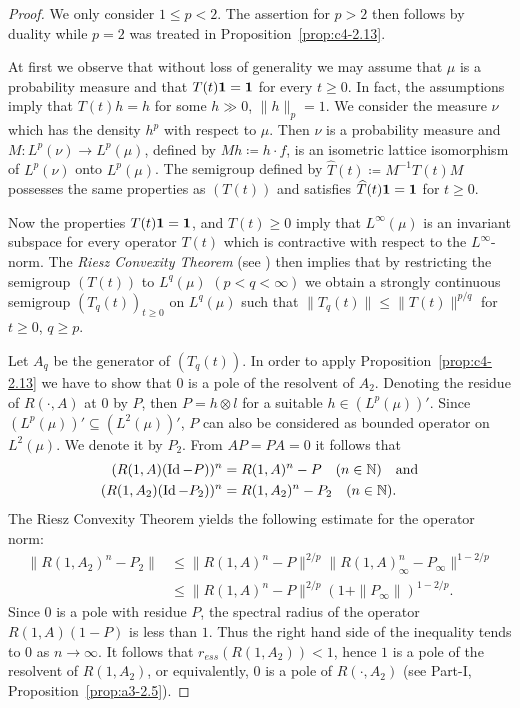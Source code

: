 \begin{proof}
We only consider $1 \leq p < 2$.
The assertion for $p > 2$ then follows by duality while $p = 2$ was treated in Proposition~\ref{prop:c4-2.13}.

At first we observe that without loss of generality we may assume that $\mu$ is a probability measure and that $T(t)\mathbf{1} = \mathbf{1}$ for every $t \geq 0$.
In fact, the assumptions imply that $T(t)h = h$ for some $h \gg 0$, $\|h\|_{p} = 1$.
We consider the measure $\nu$ which has the density $h^{p}$ with respect to $\mu$.
Then $\nu$ is a probability measure and 
$M \colon L^{p}(\nu) \to L^{p}(\mu)$, defined by $Mh \coloneqq h\cdot f$, is an isometric lattice isomorphism of\/ $L^{p}(\nu)$ onto $L^{p}(\mu)$.
The semigroup defined by $\widehat{T}(t) \coloneqq M^{-1}T(t)M$ possesses the same properties as $(T(t))$ and satisfies $\widehat{T}(t)\mathbf{1} = \mathbf{1}$ for $t \geq 0$.

Now the properties $T(t)\mathbf{1} = \mathbf{1}$, and $T(t) \geq 0$ imply that $L^{\infty}(\mu)$ is an invariant subspace for every operator $T(t)$ which is contractive with respect to the $L^{\infty}$-norm.
The \emph{Riesz Convexity Theorem} (see \textcite[VI.10.11]{dunfordschwartz:1958}) then implies that by restricting the semigroup $(T(t))$ to $L^{q}(\mu)$ $(p < q < \infty)$ we obtain a strongly continuous semigroup $(T_{q}(t))_{t \geq 0}$ on $L^{q}(\mu)$ such that $\|T_{q}(t)\| \leq \|T(t)\|^{p/q}$ for $t \geq 0$, $q \geq p$.

Let $A_{q}$ be the generator of\/ $(T_{q}(t))$.
In order to apply Proposition~\ref{prop:c4-2.13} we have to show that $0$ is a pole of the resolvent of\/ $A_{2}$.
Denoting the residue of\/ $R(\cdot,A)$ at $0$ by $P$, then $P = h \otimes l$ for a suitable $h \in (L^{p}(\mu))'$.
Since $(L^{p}(\mu))' \subseteq (L^{2}(\mu))'$, $P$ can also be considered as bounded operator on $L^{2}(\mu)$.
We denote it by $P_{2}$.
From $AP = PA = 0$ it follows that
\begin{align*}
(R(1,A)(\operatorname{Id}-P))^{n} &= R(1,A)^{n} - P \quad (n \in \mathbb{N}) \quad \text{and} \\
(R(1,A_{2})(\operatorname{Id}-P_{2}))^{n} &= R(1,A_{2})^{n} - P_{2} \quad (n \in \mathbb{N}).
\end{align*}
The Riesz Convexity Theorem yields the following estimate for the operator norm:
\begin{align*}
\|R(1,A_{2})^{n} - P_{2}\| &\leq \|R(1,A)^{n} - P\|^{2/p}\|R(1,A)_{\infty}^{n} - P_{\infty}\|^{1-2/p} \\
&\leq \|R(1,A)^{n} - P\|^{2/p}(1 + \|P_{\infty}\|)^{1-2/p}.
\end{align*}
Since $0$ is a pole with residue $P$, the spectral radius of the operator $R(1,A)(1-P)$ is less than $1$.
Thus the right hand side of the inequality tends to $0$ as $n \to \infty$.
It follows that $r_{ess}(R(1,A_{2})) < 1$, hence $1$ is a pole of the resolvent of\/ $R(1,A_{2})$, or equivalently, $0$ is a pole of\/ $R(\cdot,A_{2})$ (see 
Part-I, Proposition~\ref{prop:a3-2.5}).


\end{proof}

